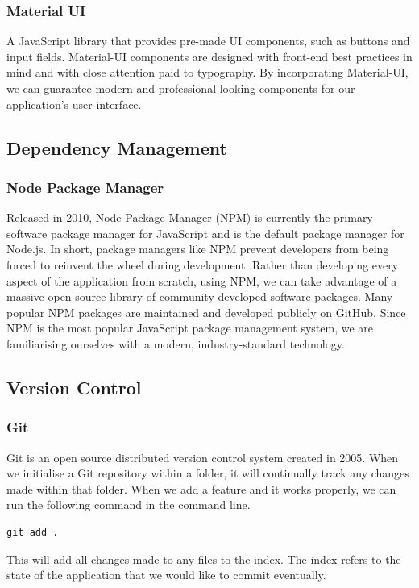\subsubsection{Material UI}
A JavaScript library that provides pre-made UI components, such as buttons and input fields. Material-UI components are designed with front-end best practices in mind and with close attention paid to typography. By incorporating Material-UI, we can guarantee modern and professional-looking components for our application's user interface. 
\subsection{Dependency Management}
\subsubsection{Node Package Manager}
\label{npm_section}
Released in 2010, Node Package Manager (NPM) is currently the primary software package manager for JavaScript and is the default package manager for Node.js.  
In short, package managers like NPM prevent developers from being forced to reinvent the wheel during development. Rather than developing every aspect of the application from scratch, using NPM, we can take advantage of a massive open-source library of community-developed software packages. Many popular NPM packages are maintained and developed publicly on GitHub. Since NPM is the most popular JavaScript package management system, we are familiarising ourselves with a modern, industry-standard technology.     

\subsection{Version Control}
\subsubsection{Git}

Git is an open source distributed version control system created in 2005. When we initialise a Git repository within a folder, it will continually track any changes made within that folder. When we add a feature and it works properly, we can run the following command in the command line.  

\begin{verbatim}
git add .    
\end{verbatim}
  
This will add all changes made to any files to the index. The index refers to the state of the application that we would like to commit eventually.~\cite{loeliger2012version}   

